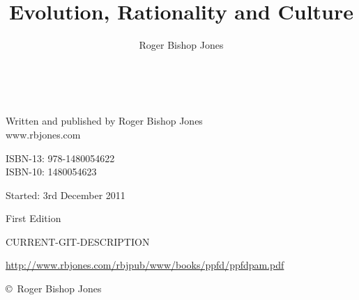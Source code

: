 \documentclass[10pt,a4paper.titlepage,openany,twocolumn]{book}
\author{Roger Bishop Jones}
\title{Evolution, Rationality and Culture}
\begin{document}
\frontmatter

\begin{titlepage}
\maketitle

\vfill

\begin{centering}

\

\vfill
Written and published by Roger Bishop Jones\\
www.rbjones.com\\
\vspace{0.2in}

ISBN-13: 978-1480054622\\
ISBN-10: 1480054623

{\footnotesize

Started: 3rd December 2011

First Edition

\vspace{0.2in}

\tiny{CURRENT-GIT-DESCRIPTION}

\vspace{0.2in}


\href{http://www.rbjones.com/rbjpub/www/books/ppfd/ppfdpam.pdf}
{http://www.rbjones.com/rbjpub/www/books/ppfd/ppfdpam.pdf}


\copyright\ Roger Bishop Jones

}%

\end{centering}

\thispagestyle{empty}
\end{titlepage}

\onecolumn

{\parskip=0pt\tableofcontents}

\vfill

\pagebreak

\twocolumn
\end{document}
